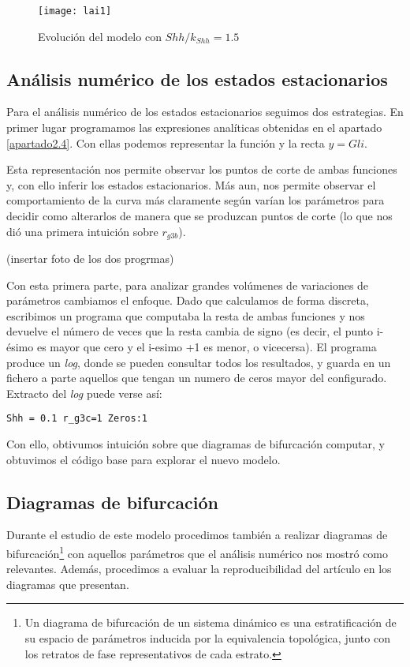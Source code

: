 \begin{figure}[h]
	\texttt{[image: lai1]}
	\centering
	\caption{Evolución del modelo \cite{schaffer} con $Shh/k_{Shh}=1.5$}
	\label{lai2}
\end{figure}

\subsection{Análisis numérico de los estados estacionarios}

Para el análisis numérico de los estados estacionarios seguimos dos estrategias. 
En primer lugar programamos las expresiones analíticas obtenidas en el apartado \ref{apartado2.4}. Con ellas podemos representar la función y la recta $y=Gli$. 

Esta representación nos permite observar los puntos de corte de ambas funciones y, con ello inferir los estados estacionarios. Más aun, nos permite observar el comportamiento de la curva más claramente según varían los parámetros para decidir como alterarlos de manera que se produzcan puntos de corte (lo que nos dió una primera intuición sobre $r_{g3b}$).

(insertar foto de los dos progrmas)

Con esta primera parte, para analizar grandes volúmenes de variaciones de parámetros cambiamos el enfoque. Dado que calculamos de forma discreta, escribimos un programa que computaba la resta de ambas funciones y nos devuelve el número de veces que la resta cambia de signo (es decir, el punto i-ésimo es mayor que cero y el i-esimo +1 es menor, o vicecersa).
El programa produce un \textit{log}, donde se pueden consultar todos los resultados, y guarda en un fichero a parte aquellos que tengan un numero de ceros mayor del configurado.
Extracto del \textit{log} puede verse así:
\begin{verbatim}
Shh = 0.1 r_g3c=1 Zeros:1
\end{verbatim}

Con ello, obtivumos intuición sobre que diagramas de bifurcación computar, y obtuvimos el código base para explorar el nuevo modelo.



\subsection{Diagramas de bifurcación}
Durante el estudio de este modelo procedimos también a realizar diagramas de bifurcación\footnote{Un diagrama de bifurcación de un sistema dinámico es una estratificación de su espacio de parámetros inducida por la equivalencia topológica, junto con los retratos de fase representativos de cada estrato.} con aquellos parámetros que el análisis numérico nos mostró como relevantes. Además, procedimos a evaluar la reproducibilidad del artículo en los diagramas que presentan. 

